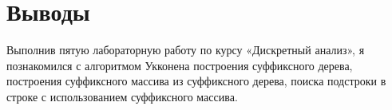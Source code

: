 \section{Выводы}

Выполнив пятую лабораторную работу по курсу «Дискретный анализ», я познакомился с алгоритмом Укконена построения суффиксного дерева, построения суффиксного массива из суффиксного дерева, поиска подстроки в строке с использованием суффиксного массива.

\pagebreak
